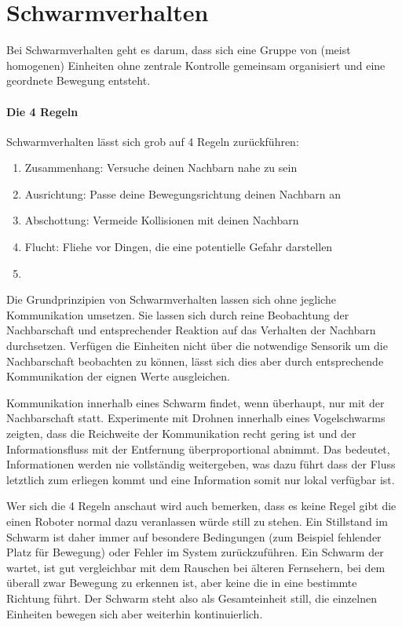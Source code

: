 \section{Schwarmverhalten}\label{sec:Schwarmverhalten}
Bei Schwarmverhalten geht es darum, dass sich eine Gruppe von (meist homogenen) Einheiten ohne zentrale Kontrolle gemeinsam organisiert und eine geordnete Bewegung entsteht.

\paragraph*{Die 4 Regeln}\label{4Rules}
Schwarmverhalten lässt sich grob auf 4 Regeln zurückführen:

\begin{enumerate}
	\item Zusammenhang: Versuche deinen Nachbarn nahe zu sein
	\item Ausrichtung: Passe deine Bewegungsrichtung deinen Nachbarn an
	\item Abschottung: Vermeide Kollisionen mit deinen Nachbarn
	\item Flucht: Fliehe vor Dingen, die eine potentielle Gefahr darstellen
	\item {}
\end{enumerate}

Die Grundprinzipien von Schwarmverhalten lassen sich ohne jegliche Kommunikation umsetzen.
Sie lassen sich durch reine Beobachtung der Nachbarschaft und entsprechender Reaktion auf das Verhalten der Nachbarn durchsetzen.
Verfügen die Einheiten nicht über die notwendige Sensorik um die Nachbarschaft beobachten zu können, lässt sich dies aber durch entsprechende Kommunikation der eignen Werte ausgleichen.

Kommunikation innerhalb eines Schwarm findet, wenn überhaupt, nur mit der Nachbarschaft statt.
Experimente mit Drohnen innerhalb eines Vogelschwarms zeigten, dass die Reichweite der Kommunikation recht gering ist und der Informationsfluss mit der Entfernung überproportional abnimmt.
Das bedeutet, Informationen werden nie vollständig weitergeben, was dazu führt dass der Fluss letztlich zum erliegen kommt und eine Information somit nur lokal verfügbar ist.

Wer sich die 4 Regeln anschaut wird auch bemerken, dass es keine Regel gibt die einen Roboter normal dazu veranlassen würde still zu stehen.
Ein Stillstand im Schwarm ist daher immer auf besondere Bedingungen (zum Beispiel fehlender Platz für Bewegung) oder Fehler im System zurückzuführen.
Ein Schwarm der wartet, ist gut vergleichbar mit dem Rauschen bei älteren Fernsehern, bei dem überall zwar Bewegung zu erkennen ist, aber keine die in eine bestimmte Richtung führt.
Der Schwarm steht also als Gesamteinheit still, die einzelnen Einheiten bewegen sich aber weiterhin kontinuierlich.

